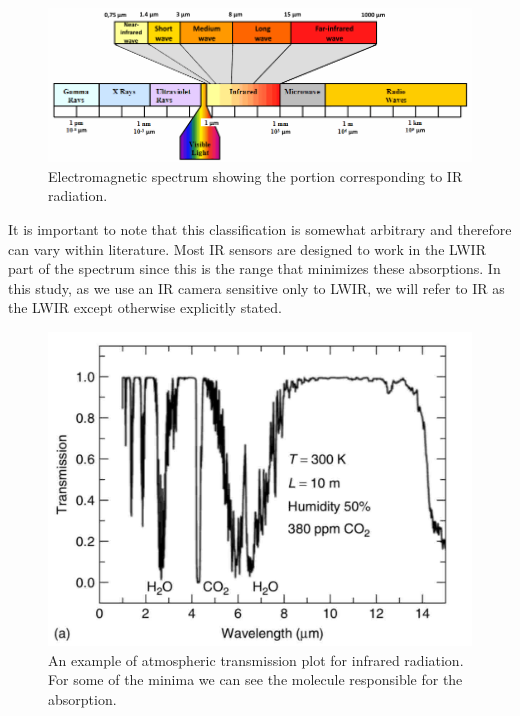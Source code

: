 		\begin{figure}[ht!]
			\centering
			\captionsetup{justification=centering,margin=2cm}
			\includegraphics[scale=0.75]{Figures/Chapter01/Spectrum-of-electromagnetic-radiation.png}
			\caption{Electromagnetic spectrum showing the portion corresponding to IR radiation.}\label{fig1.1}
		\end{figure}
		
		It is important to note that this classification is somewhat arbitrary and therefore can vary within literature. Most IR sensors are designed to work in the LWIR part of the spectrum since this is the range that minimizes these absorptions. In this study, as we use an IR camera sensitive only to LWIR, we will refer to IR as the LWIR except otherwise explicitly stated.
				
		\begin{figure}[ht!]
			\centering
			\captionsetup{justification=centering,margin=2cm}
			\includegraphics[scale=0.35]{Figures/Chapter01/Transmission.jpg}
			\caption{An example of atmospheric transmission plot for infrared radiation. For some of the minima we can see the molecule responsible for the absorption.}\label{fig1.2}
		\end{figure}
		
